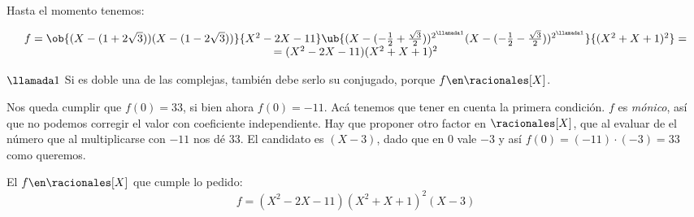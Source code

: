 Hasta el momento tenemos:\par
$$
\begin{array}{c}
f =
\ob{(X - (1+2\sqrt{3})) (X - (1-2\sqrt{3}))}{X^2 - 2X - 11}
\ub{(X - (-\frac{1}{2} + \frac{\sqrt{3}}{2}))^{2^{\llamada1}}
(X - (-\frac{1}{2} - \frac{\sqrt{3}}{2}))^{2^{\llamada1}}}{(X^2 + X + 1)^2} =\\
=(X^2 - 2X - 11)(X^2 + X + 1)^2
\end{array}
$$

$\llamada1$ Si es doble una de las complejas, también debe serlo su conjugado, porque
$f\en \racionales[X]$.\bigskip

Nos queda cumplir que $f(0) = 33$, si bien ahora $f(0) = -11$. Acá tenemos que tener en cuenta
la primera condición. $f$ es \textit{mónico}, así que no podemos corregir el valor con coeficiente independiente.
Hay que proponer otro factor en $\racionales[X]$, que al evaluar de el número que al multiplicarse con $-11$ nos dé
33. El candidato es $(X-3)$, dado que en 0 vale $-3$ y así $f(0) = (-11) \cdot (-3) = 33$ como queremos.\par

El $f \en\racionales[X]$ que cumple lo pedido:
$$
\boxed{f = (X^2 - 2X - 11)(X^2 + X + 1)^2(X-3)}
$$



